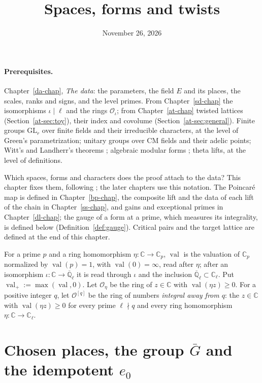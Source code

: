 \documentclass[reqno]{amsart}
\title{Spaces, forms and twists}
\author{}
\date{November 26, 2026}
\newcounter{chap}
\theoremstyle{plain}
\theoremstyle{definition}
\newcommand{\Q}{{\mathbb{Q}}}
\newcommand{\C}{{\mathbb{C}}}
\newcommand{\Oc}{\mathcal O}
\begin{document}
\maketitle
{}\label{chap}

\paragraph{Prerequisites.}
Chapter~\ref{da-chap}, \emph{The data}: the parameters, the field \(E\) and its places, the scales, ranks and signs, and the level primes.  From Chapter~\ref{sd-chap} the isomorphisms \(\iota \mid \ell\) and the rings \(\Oc_\iota\); from Chapter~\ref{at-chap} twisted lattices (Section~\ref{at-sec:toy}), their index and covolume (Section~\ref{at-sec:general}).  Finite groups \(\mathrm{GL}_r\) over finite fields and their irreducible characters, at the level of Green's parametrization; unitary groups over CM fields and their adelic points; Witt's and Landherr's theorems \cite{Sch}; algebraic modular forms \cite{Gr}; theta lifts, at the level of definitions.

\medskip
Which spaces, forms and characters does the proof attach to the data?  This chapter fixes them, following \cite{GL}; the later chapters use this notation.  The Poincar\'e map is defined in Chapter~\ref{bp-chap}, the composite lift and the data of each lift of the chain in Chapter~\ref{ss-chap}, and gains and exceptional primes in Chapter~\ref{dl-chap}; the gauge of a form at a prime, which measures its integrality, is defined below (Definition~\ref{def:gauge}).  Critical pairs and the target lattice are defined at the end of this chapter.

For a prime \(p\) and a ring homomorphism \(\eta\colon \C \to \C_p\), \(\operatorname{val}\) is the valuation of \(\C_p\) normalized by \(\operatorname{val}(p) = 1\), with \(\operatorname{val}(0) = \infty\), read after \(\eta\); after an isomorphism \(\iota\colon \C \to \overline{\Q}_\ell\) it is read through \(\iota\) and the inclusion \(\overline{\Q}_\ell \subset \C_\ell\).  Put \(\operatorname{val}_+ := \max(\operatorname{val}, 0)\).  Let \(\Oc_\eta\) be the ring of \(z \in \C\) with \(\operatorname{val}(\eta z) \ge 0\).  For a positive integer \(q\), let \(\Oc^{[q]}\) be the ring of numbers \emph{integral away from \(q\)}: the \(z \in \C\) with \(\operatorname{val}(\eta z) \ge 0\) for every prime \(\ell \nmid q\) and every ring homomorphism \(\eta\colon \C \to \C_\ell\).

\section{Chosen places, the group \(\bar G\) and the idempotent \(e_0\)}\label{sec:chosen}
\end{document}
